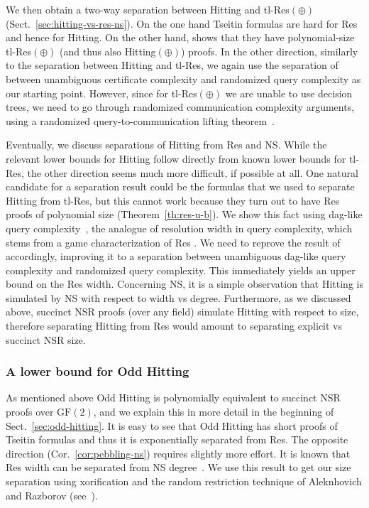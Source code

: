 \documentclass[11pt]{article}
\newcommand{\scterm}[1]{{\textrm{\sc #1}}}
\newcommand{\hit}{\scterm{Hitting}}
\newcommand{\tres}{\scterm{tl-Res}}
\newcommand{\res}{\scterm{Res}}
\newcommand{\tresp}{{\tres}$(\oplus)$}
\newcommand{\ns}{\scterm{NS}}
\newcommand{\nsr}{\scterm{NSR}}
\newcommand{\hitp}{{\hit}$(\oplus)$}
\newcommand{\hitodd}{\scterm{Odd} {\hit}}
\newcommand{\GF}{\mathrm{GF}}
\numberwithin{equation}{section}
\begin{document}
We then obtain a two-way separation between {\hit} and {\tresp} (Sect.~\ref{sec:hitting-vs-res-ns}). On the one hand Tseitin formulas
are hard for {\res} \cite{Urq87} and hence for {\hit}. On the other hand, 
\cite{IS20} shows that they have polynomial-size {\tresp} (and thus also {\hitp}) proofs.
In the other direction, similarly to the separation between {\hit} and {\tres},
we again use the separation of \cite{AKK16} between unambiguous certificate
complexity and randomized query complexity as our starting point. However, since for {\tresp} we are unable
to use decision trees, we need to go through randomized communication complexity arguments, using a randomized query-to-communication lifting theorem~\cite{GPW17}.

Eventually, we discuss separations of {\hit} from {\res} and {\ns}.
While the relevant lower bounds for {\hit} follow directly from known lower bounds for {\tres},
the other direction seems much more difficult, if possible at all.
One natural candidate for a separation result could be
the formulas that we used to separate
{\hit} from {\tres}, but this cannot work because they turn out to have {\res} proofs of polynomial size
(Theorem~\ref{th:res-u-b}).
We show this fact using dag-like query complexity~\cite{GGKS20}, the analogue of resolution width in query complexity, which stems from a game characterization of {\res} \cite{Pud00,AD08}.
We need to reprove the result of~\cite{AKK16} accordingly, improving it to a separation between unambiguous dag-like query complexity and randomized query complexity. This immediately yields an upper bound on the {\res} width.
Concerning {\ns}, it is a simple observation that {\hit} is simulated by {\ns} with respect to width vs degree.
Furthermore, as we discussed above, succinct {\nsr} proofs (over any field)
simulate {\hit} with respect to size, therefore separating {\hit} from {\res} would amount to separating explicit vs succinct {\nsr} size.

\subsubsection{A lower bound for {\hitodd}}

As mentioned above {\hitodd} is polynomially equivalent to succinct {\nsr} proofs over $\GF(2)$, and
we explain this in more detail in the beginning of Sect.~\ref{sec:odd-hitting}. It is
easy to see that {\hitodd} has short proofs of Tseitin formulas and thus it is
exponentially separated from {\res}.
The opposite direction (Cor.~\ref{cor:pebbling-ns}) requires slightly more effort.
It is known that {\res} width can be separated from {\ns} degree~\cite{BOPCI00}.
We use this result to get our size separation
using xorification and the random restriction technique of Aleknhovich
and Razborov (see~\cite{Ben02}).
\end{document}
